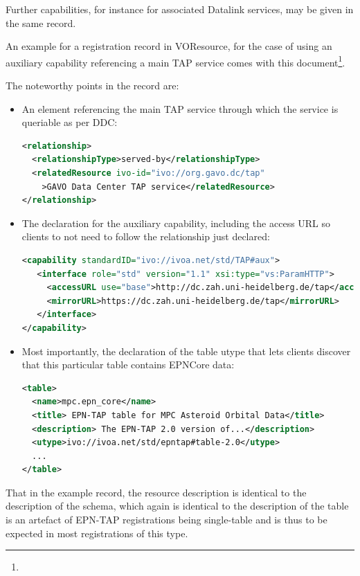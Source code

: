 \documentclass[11pt,a4paper]{ivoa}
\begin{document}
Further capabilities, for instance for associated Datalink services,
may be given in the same record.

An example for a registration record in VOResource, for the case of
using an auxiliary capability referencing a main TAP service comes with
this document\footnote{}.

The noteworthy points in the record are:

\begin{itemize}
\item An  element referencing the main TAP service 
through which the service is queriable as per DDC:
\begin{lstlisting}[language=XML,basicstyle=\footnotesize]
<relationship>
  <relationshipType>served-by</relationshipType>
  <relatedResource ivo-id="ivo://org.gavo.dc/tap"
    >GAVO Data Center TAP service</relatedResource>
</relationship>
\end{lstlisting}

\item The declaration for the auxiliary capability, including the access
URL so clients to not need to follow the relationship just declared:
\begin{lstlisting}[language=XML,basicstyle=\footnotesize]
<capability standardID="ivo://ivoa.net/std/TAP#aux">
   <interface role="std" version="1.1" xsi:type="vs:ParamHTTP">
     <accessURL use="base">http://dc.zah.uni-heidelberg.de/tap</accessURL>
     <mirrorURL>https://dc.zah.uni-heidelberg.de/tap</mirrorURL>
   </interface>
</capability>
\end{lstlisting}

\item Most importantly, the declaration of the table utype that lets
clients discover that this particular table contains EPNCore data:
\begin{lstlisting}[language=XML,basicstyle=\footnotesize]
<table>
  <name>mpc.epn_core</name>
  <title> EPN-TAP table for MPC Asteroid Orbital Data</title>
  <description> The EPN-TAP 2.0 version of...</description>
  <utype>ivo://ivoa.net/std/epntap#table-2.0</utype>
  ...
</table>
\end{lstlisting}
\end{itemize}

That in the example record, the resource description is identical to the
description of the schema, which again is identical to the description
of the table is an artefact of EPN-TAP registrations being single-table
and is thus to be expected in most registrations of this type.
\end{document}
